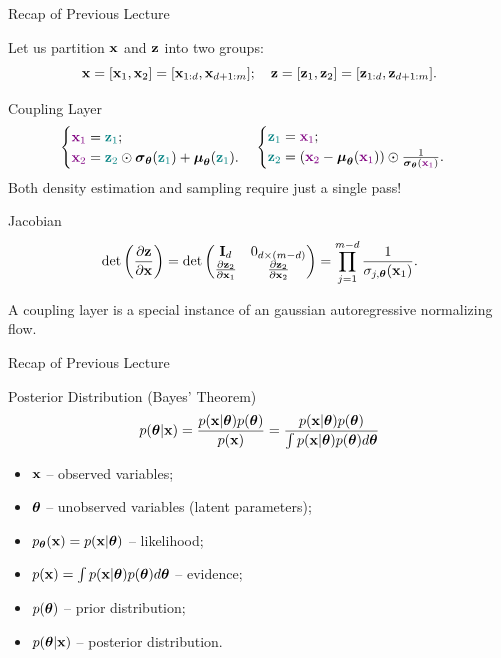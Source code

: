 \documentclass{beamer}
\begin{document}
\begin{frame}{Recap of Previous Lecture}

	Let us partition $\mathbf{x}$ and $\mathbf{z}$ into two groups: 
	\[
		\mathbf{x} = [\mathbf{x}_1, \mathbf{x}_2] = [\mathbf{x}_{1:d}, \mathbf{x}_{d+1:m}]; \quad \mathbf{z} = [\mathbf{z}_1, \mathbf{z}_2] = [\mathbf{z}_{1:d}, \mathbf{z}_{d+1:m}].
	\]
	\vspace{-0.7cm}
	\begin{block}{Coupling Layer}
		\vspace{-0.7cm}
		\[
			\begin{cases} {\color{violet}\mathbf{x}_1} = {\color{teal}\mathbf{z}_1}; \\ {\color{violet}\mathbf{x}_2} = {\color{teal}\mathbf{z}_2} \odot \boldsymbol{\sigma}_{\boldsymbol{\theta}}({\color{teal}\mathbf{z}_1}) + \boldsymbol{\mu}_{\boldsymbol{\theta}}({\color{teal}\mathbf{z}_1}).\end{cases}  
			\begin{cases} {\color{teal}\mathbf{z}_1} ={\color{violet} \mathbf{x}_1}; \\ {\color{teal}\mathbf{z}_2} = \left({\color{violet}\mathbf{x}_2} - \boldsymbol{\mu}_{\boldsymbol{\theta}}({\color{violet}\mathbf{x}_1}) \right) \odot \frac{1}{\boldsymbol{\sigma}_{\boldsymbol{\theta}}({\color{violet}\mathbf{x}_1})}.\end{cases}
		\]
		Both density estimation and sampling require just a single pass!
	\end{block}
	\begin{block}{Jacobian}
		\vspace{-0.3cm}
		\[
			\det \left( \frac{\partial \mathbf{z}}{\partial \mathbf{x}} \right) = \det 
			\begin{pmatrix}
				\mathbf{I}_d & 0_{d \times (m - d)} \\
				\frac{\partial \mathbf{z}_2}{\partial \mathbf{x}_1} & \frac{\partial \mathbf{z}_2}{\partial \mathbf{x}_2}
			\end{pmatrix} = \prod_{j=1}^{m - d} \frac{1}{\sigma_{j, \boldsymbol{\theta}}(\mathbf{x}_1)}.
		\]
	\end{block}
	A coupling layer is a special instance of an gaussian autoregressive normalizing flow.
\end{frame}
\begin{frame}{Recap of Previous Lecture}
	\begin{block}{Posterior Distribution (Bayes' Theorem)}
		\[
			p(\boldsymbol{\theta} | \mathbf{x}) = \frac{p(\mathbf{x} | \boldsymbol{\theta}) p(\boldsymbol{\theta})}{p(\mathbf{x})} = \frac{p(\mathbf{x} | \boldsymbol{\theta}) p(\boldsymbol{\theta})}{\int p(\mathbf{x} | \boldsymbol{\theta}) p(\boldsymbol{\theta}) d \boldsymbol{\theta}} 
		\]
		\begin{itemize}
			\item $\mathbf{x}$ -- observed variables;
			\item $\boldsymbol{\theta}$ -- unobserved variables (latent parameters);
			\item $p_{\boldsymbol{\theta}}(\mathbf{x}) = p(\mathbf{x} | \boldsymbol{\theta})$ -- likelihood;
			\item $p(\mathbf{x}) = \int p(\mathbf{x} | \boldsymbol{\theta}) p(\boldsymbol{\theta}) d \boldsymbol{\theta}$ -- evidence;
			\item $p(\boldsymbol{\theta})$ -- prior distribution;
			\item $p(\boldsymbol{\theta} | \mathbf{x})$ -- posterior distribution.
		\end{itemize}
	\end{block}
\end{frame}
\end{document}
